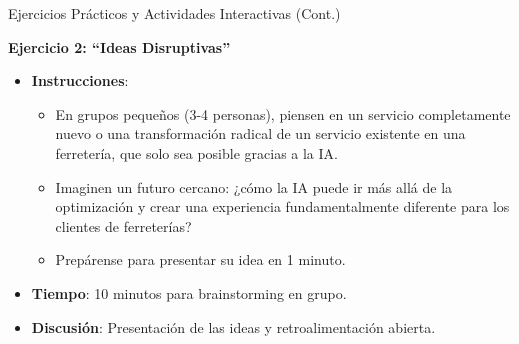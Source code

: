 \documentclass[aspectratio=169]{beamer}
\begin{document}
\begin{frame}{Ejercicios Prácticos y Actividades Interactivas (Cont.)}


\textbf{Ejercicio 2: ``Ideas Disruptivas''}

\begin{itemize}
  \item \textbf{Instrucciones}:
  \begin{itemize}
    \item En grupos pequeños (3-4 personas), piensen en un servicio completamente nuevo o una transformación radical de un servicio existente en una ferretería, que solo sea posible gracias a la IA.
    \item Imaginen un futuro cercano: ¿cómo la IA puede ir más allá de la optimización y crear una experiencia fundamentalmente diferente para los clientes de ferreterías?
    \item Prepárense para presentar su idea en 1 minuto.
  \end{itemize}
  \item \textbf{Tiempo}: 10 minutos para brainstorming en grupo.
  \item \textbf{Discusión}: Presentación de las ideas y retroalimentación abierta.
\end{itemize}
\end{frame}
\end{document}
